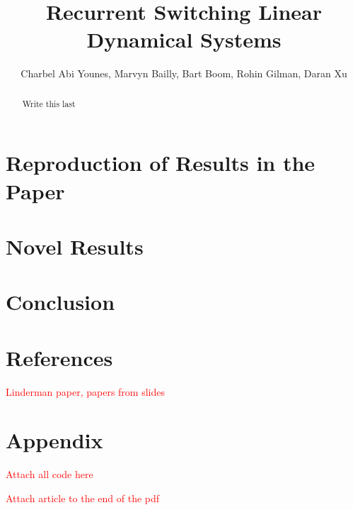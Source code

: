 \documentclass{amsart}
\title{Recurrent Switching Linear Dynamical Systems}
\author{Charbel Abi Younes, Marvyn Bailly, Bart Boom, Rohin Gilman, Daran Xu}
\date{}
\begin{document}
\begin{abstract}
	Write this last
\end{abstract}

\maketitle



\section{Reproduction of Results in the Paper}

\section{Novel Results}

\section{Conclusion}

\section{References}

\textcolor{red}{Linderman paper, papers from slides}

\section{Appendix}

\textcolor{red}{Attach all code here}

\textcolor{red}{Attach article to the end of the pdf}
\end{document}
